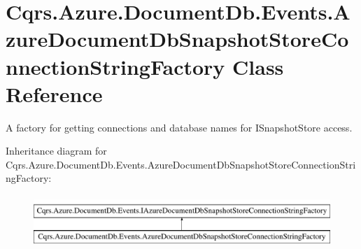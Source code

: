 \hypertarget{classCqrs_1_1Azure_1_1DocumentDb_1_1Events_1_1AzureDocumentDbSnapshotStoreConnectionStringFactory}{}\section{Cqrs.\+Azure.\+Document\+Db.\+Events.\+Azure\+Document\+Db\+Snapshot\+Store\+Connection\+String\+Factory Class Reference}
\label{classCqrs_1_1Azure_1_1DocumentDb_1_1Events_1_1AzureDocumentDbSnapshotStoreConnectionStringFactory}


A factory for getting connections and database names for I\+Snapshot\+Store access.  


Inheritance diagram for Cqrs.\+Azure.\+Document\+Db.\+Events.\+Azure\+Document\+Db\+Snapshot\+Store\+Connection\+String\+Factory\+:\begin{figure}[H]
\begin{center}
\leavevmode
\includegraphics[height=2.000000cm]{classCqrs_1_1Azure_1_1DocumentDb_1_1Events_1_1AzureDocumentDbSnapshotStoreConnectionStringFactory}
\end{center}
\end{figure}
